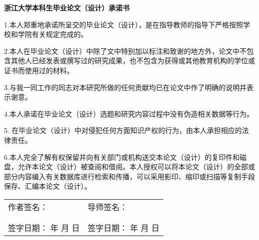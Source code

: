 {
  \setlength{\parindent}{0em}
  \linespread{1}

  \vspace*{0.2em}

  {
    \centering
    \fangsong\sanhao\bfseries
    浙江大学本科生毕业论文（设计）承诺书 \par
  }

  \vspace{1em}

  {
    \setlength{\parindent}{2em}
    \linespread{1.6}
    \fangsong\sihao
    1.本人郑重地承诺所呈交的毕业论文（设计），是在指导教师的指导下严格按照学校和学院有关规定完成的。\par
    2.本人在毕业论文（设计）中除了文中特别加以标注和致谢的地方外，论文中不包含其他人已经发表或撰写过的研究成果，也不包含为获得\underline{\fangsong\sihao\bfseries {}}或其他教育机构的学位或证书而使用过的材料。\par
    3.与我一同工作的同志对本研究所做的任何贡献均已在论文中作了明确的说明并表示谢意。 \par
    4.本人承诺在毕业论文（设计）选题和研究内容过程中没有伪造相关数据等行为。\par
    5. 在毕业论文（设计）中对侵犯任何方面知识产权的行为，由本人承担相应的法律责任。\par
    6.本人完全了解\underline{\fangsong\sihao\bfseries {}}有权保留并向有关部门或机构送交本论文（设计）的复印件和磁盘，允许本论文（设计）被查阅和借阅。本人授权\underline{\fangsong\sihao\bfseries {}}可以将本论文（设计）的全部或部分内容编入有关数据库进行检索和传播，可以采用影印、缩印或扫描等复制手段保存、汇编本论文（设计）。 \par

  }

  \vspace{2.9em}

  {
    \fangsong\sihao
    \begin{tabular}{@{} p{0.5\linewidth} p{0.5\linewidth} @{}}
    作者签名： & 导师签名： \\
     & \\
     & \\
    签字日期： \hspace{2em} 年 \hspace{1em} 月 \hspace{1em} 日 & 签字日期： \hspace{2em} 年 \hspace{1em} 月 \hspace{1em} 日 \\
    \end{tabular} \par
  }
}
